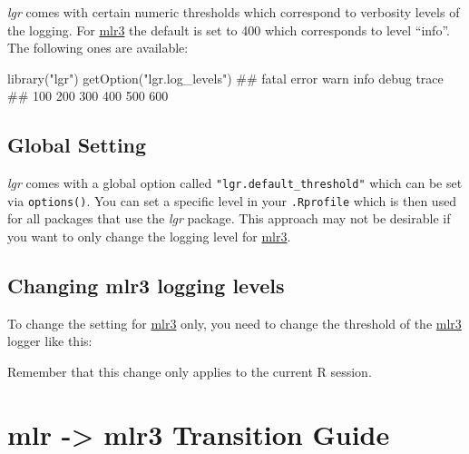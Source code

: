 \documentclass[
  11pt,
  parskip=half,
  DIV=calc,
  BCOR=10mm,
  x11names]{scrbook}
\newenvironment{Shaded}{}{}
\newcommand{\KeywordTok}[1]{\textcolor[rgb]{0.00,0.00,1.00}{#1}}
\newcommand{\NormalTok}[1]{#1}
\newcommand{\OperatorTok}[1]{#1}
\newcommand{\StringTok}[1]{\textcolor[rgb]{0.00,0.50,0.50}{#1}}
\begin{document}
\emph{lgr} comes with certain numeric thresholds which correspond to verbosity levels of the logging.
For \href{https://mlr3.mlr-org.com}{mlr3} the default is set to 400 which corresponds to level ``info''.
The following ones are available:

\begin{Shaded}
\begin{Highlighting}[]
\KeywordTok{library}\NormalTok{(}\StringTok{"lgr"}\NormalTok{)}
\KeywordTok{getOption}\NormalTok{(}\StringTok{"lgr.log_levels"}\NormalTok{)}
\NormalTok{## fatal error  warn  info debug trace }
\NormalTok{##   100   200   300   400   500   600}
\end{Highlighting}
\end{Shaded}

\hypertarget{global-setting}{%
\subsection{Global Setting}\label{global-setting}}

\emph{lgr} comes with a global option called \texttt{"lgr.default\_threshold"} which can be set via \texttt{options()}.
You can set a specific level in your \texttt{.Rprofile} which is then used for all packages that use the \emph{lgr} package.
This approach may not be desirable if you want to only change the logging level for \href{https://mlr3.mlr-org.com}{mlr3}.

\hypertarget{changing-mlr3-logging-levels}{%
\subsection{Changing mlr3 logging levels}\label{changing-mlr3-logging-levels}}

To change the setting for \href{https://mlr3.mlr-org.com}{mlr3} only, you need to change the threshold of the \href{https://mlr3.mlr-org.com}{mlr3} logger like this:

\begin{Shaded}
\end{Shaded}

Remember that this change only applies to the current R session.

\hypertarget{transition}{%
\section{mlr -\textgreater{} mlr3 Transition Guide}\label{transition}}
\end{document}
